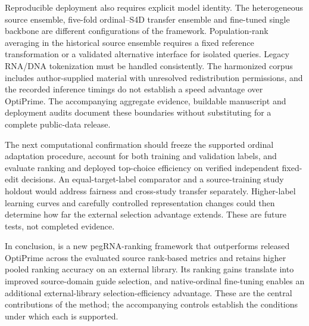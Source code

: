 Reproducible deployment also requires explicit model identity. The heterogeneous source ensemble, five-fold ordinal--S4D transfer ensemble and fine-tuned single backbone are different configurations of the framework. Population-rank averaging in the historical source ensemble requires a fixed reference transformation or a validated alternative interface for isolated queries. Legacy RNA/DNA tokenization must be handled consistently. The harmonized corpus includes author-supplied material with unresolved redistribution permissions, and the recorded inference timings do not establish a speed advantage over OptiPrime. The accompanying aggregate evidence, buildable manuscript and deployment audits document these boundaries without substituting for a complete public-data release.

The next computational confirmation should freeze the supported ordinal adaptation procedure, account for both training and validation labels, and evaluate ranking and deployed top-choice efficiency on verified independent fixed-edit decisions. An equal-target-label comparator and a source-training study holdout would address fairness and cross-study transfer separately. Higher-label learning curves and carefully controlled representation changes could then determine how far the external selection advantage extends. These are future tests, not completed evidence.

In conclusion, \model{} is a new pegRNA-ranking framework that outperforms released OptiPrime across the evaluated source rank-based metrics and retains higher pooled ranking accuracy on an external library. Its ranking gains translate into improved source-domain guide selection, and native-ordinal fine-tuning enables an additional external-library selection-efficiency advantage. These are the central contributions of the method; the accompanying controls establish the conditions under which each is supported.
